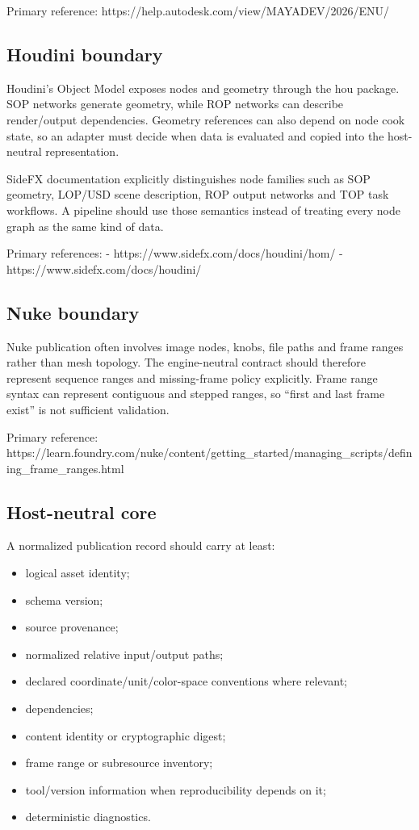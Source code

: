 Primary reference: https://help.autodesk.com/view/MAYADEV/2026/ENU/

\subsection{Houdini boundary}\label{appendix-03ade9e1875f-houdini-boundary}

Houdini's Object Model exposes nodes and geometry through the hou package. SOP networks generate geometry, while ROP networks can describe render/output dependencies. Geometry references can also depend on node cook state, so an adapter must decide when data is evaluated and copied into the host-neutral representation.

SideFX documentation explicitly distinguishes node families such as SOP geometry, LOP/USD scene description, ROP output networks and TOP task workflows. A pipeline should use those semantics instead of treating every node graph as the same kind of data.

Primary references: - https://www.sidefx.com/docs/houdini/hom/ - https://www.sidefx.com/docs/houdini/

\subsection{Nuke boundary}\label{appendix-03ade9e1875f-nuke-boundary}

Nuke publication often involves image nodes, knobs, file paths and frame ranges rather than mesh topology. The engine-neutral contract should therefore represent sequence ranges and missing-frame policy explicitly. Frame range syntax can represent contiguous and stepped ranges, so ``first and last frame exist'' is not sufficient validation.

Primary reference: https://learn.foundry.com/nuke/content/getting\_started/managing\_scripts/defining\_frame\_ranges.html

\subsection{Host-neutral core}\label{appendix-03ade9e1875f-host-neutral-core}

A normalized publication record should carry at least:

\begin{itemize}
\tightlist
\item
  logical asset identity;
\item
  schema version;
\item
  source provenance;
\item
  normalized relative input/output paths;
\item
  declared coordinate/unit/color-space conventions where relevant;
\item
  dependencies;
\item
  content identity or cryptographic digest;
\item
  frame range or subresource inventory;
\item
  tool/version information when reproducibility depends on it;
\item
  deterministic diagnostics.
\end{itemize}


